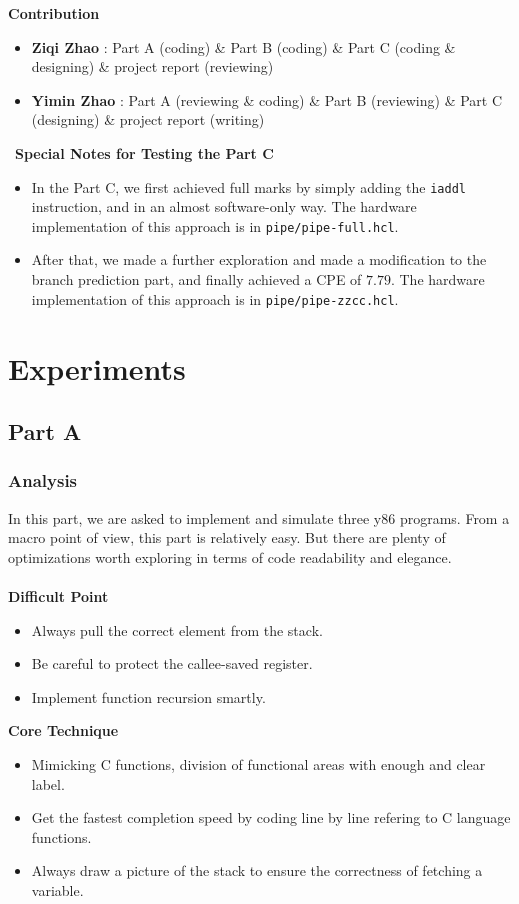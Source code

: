 \documentclass[12pt,a4paper]{article}
\begin{document}
\textbf{Contribution}
\begin{itemize}
	\item \textbf{Ziqi Zhao} : Part A (coding) \& Part B (coding) \& Part C (coding \& designing) \& project report (reviewing)
	\item \textbf{Yimin Zhao} : Part A (reviewing \& coding) \& Part B (reviewing) \& Part C (designing) \& project report (writing)
\end{itemize}
\
\textbf{Special Notes for Testing the Part C}
\begin{itemize}
	\item In the Part C, we first achieved full marks by simply adding the \texttt{iaddl} instruction, and in an almost software-only way. The hardware implementation of this approach is in \texttt{pipe/pipe-full.hcl}.
	\item After that, we made a further exploration and made a modification to the branch prediction part, and finally achieved a CPE of $7.79$. {\color{blue}The hardware implementation of this approach is in \texttt{pipe/pipe-zzcc.hcl}.}
\end{itemize}
\pagebreak
\section{Experiments}
\subsection{Part A}
\subsubsection{Analysis}
In this part, we are asked to implement and simulate three y86 programs. 
From a macro point of view, this part is relatively easy. 
But there are plenty of optimizations worth exploring in terms of code readability and elegance.\\\\
\textbf{Difficult Point} 
\begin{itemize}
        \item Always pull the correct element from the stack.
        \item Be careful to protect the callee-saved register.
        \item Implement function recursion smartly.
\end{itemize}
\textbf{Core Technique}
\begin{itemize}
        \item Mimicking C functions, division of functional areas with enough and clear label.
        \item Get the fastest completion speed by coding line by line refering to C language functions.
        \item Always draw a picture of the stack to ensure the correctness of fetching a variable.
\end{itemize}
\end{document}
